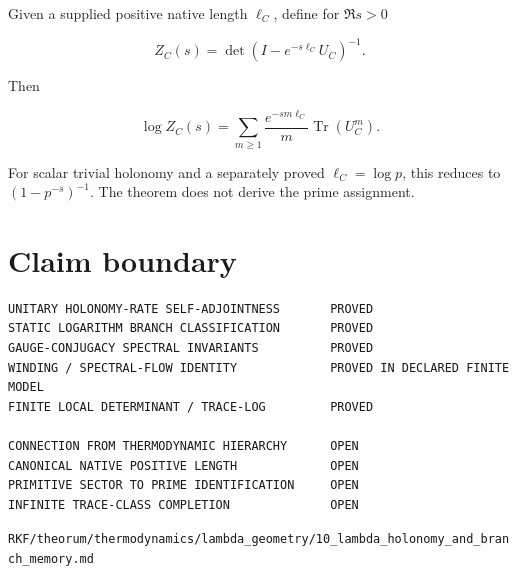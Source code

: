 Given a supplied positive native length \(\ell_C\), define for \(\Re s>0\)

\[
Z_C(s)=\det\!\left(I-e^{-s\ell_C}U_C\right)^{-1}.
\]

Then

\[
\boxed{
\log Z_C(s)=
\sum_{m\ge1}
\frac{e^{-sm\ell_C}}{m}\operatorname{Tr}(U_C^m).
}
\]

For scalar trivial holonomy and a separately proved \(\ell_C=\log p\), this reduces to \((1-p^{-s})^{-1}\). The theorem does not derive the prime assignment.

\hypertarget{claim-boundary}{%
\section{Claim boundary}\label{claim-boundary}}

\begin{verbatim}
UNITARY HOLONOMY-RATE SELF-ADJOINTNESS       PROVED
STATIC LOGARITHM BRANCH CLASSIFICATION       PROVED
GAUGE-CONJUGACY SPECTRAL INVARIANTS          PROVED
WINDING / SPECTRAL-FLOW IDENTITY             PROVED IN DECLARED FINITE MODEL
FINITE LOCAL DETERMINANT / TRACE-LOG         PROVED

CONNECTION FROM THERMODYNAMIC HIERARCHY      OPEN
CANONICAL NATIVE POSITIVE LENGTH             OPEN
PRIMITIVE SECTOR TO PRIME IDENTIFICATION     OPEN
INFINITE TRACE-CLASS COMPLETION              OPEN
\end{verbatim}

\begin{flushright}\small\texttt{RKF/theorum/thermodynamics/lambda\_geometry/10\_lambda\_holonomy\_and\_branch\_memory.md}\end{flushright}
